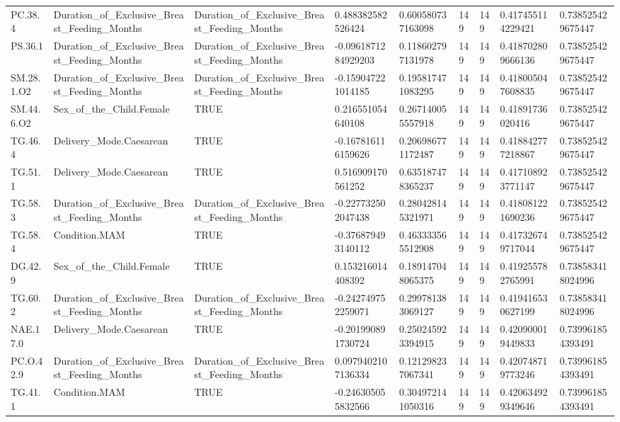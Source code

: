 \begin{longtable}{lllllllll}
PC.38.4 & Duration\_of\_Exclusive\_Breast\_Feeding\_Months & Duration\_of\_Exclusive\_Breast\_Feeding\_Months & 0.488382582526424 & 0.600580737163098 & 149 & 149 & 0.417455114229421 & 0.738525429675447 \\
PS.36.1 & Duration\_of\_Exclusive\_Breast\_Feeding\_Months & Duration\_of\_Exclusive\_Breast\_Feeding\_Months & -0.0961871284929203 & 0.118602797131978 & 149 & 149 & 0.418702809666136 & 0.738525429675447 \\
SM.28.1.O2 & Duration\_of\_Exclusive\_Breast\_Feeding\_Months & Duration\_of\_Exclusive\_Breast\_Feeding\_Months & -0.159047221014185 & 0.195817471083295 & 149 & 149 & 0.418005047608835 & 0.738525429675447 \\
SM.44.6.O2 & Sex\_of\_the\_Child.Female & TRUE & 0.216551054640108 & 0.267140055557918 & 149 & 149 & 0.41891736020416 & 0.738525429675447 \\
TG.46.4 & Delivery\_Mode.Caesarean & TRUE & -0.167816116159626 & 0.206986771172487 & 149 & 149 & 0.418842777218867 & 0.738525429675447 \\
TG.51.1 & Delivery\_Mode.Caesarean & TRUE & 0.516909170561252 & 0.635187478365237 & 149 & 149 & 0.417108923771147 & 0.738525429675447 \\
TG.58.3 & Duration\_of\_Exclusive\_Breast\_Feeding\_Months & Duration\_of\_Exclusive\_Breast\_Feeding\_Months & -0.227732502047438 & 0.280428145321971 & 149 & 149 & 0.418081221690236 & 0.738525429675447 \\
TG.58.4 & Condition.MAM & TRUE & -0.376879493140112 & 0.463333565512908 & 149 & 149 & 0.417326749717044 & 0.738525429675447 \\
DG.42.9 & Sex\_of\_the\_Child.Female & TRUE & 0.153216014408392 & 0.189147048065375 & 149 & 149 & 0.419255782765991 & 0.738583418024996 \\
TG.60.2 & Duration\_of\_Exclusive\_Breast\_Feeding\_Months & Duration\_of\_Exclusive\_Breast\_Feeding\_Months & -0.242749752259071 & 0.299781383069127 & 149 & 149 & 0.419416530627199 & 0.738583418024996 \\
NAE.17.0 & Delivery\_Mode.Caesarean & TRUE & -0.201990891730724 & 0.250245923394915 & 149 & 149 & 0.420900019449833 & 0.739961854393491 \\
PC.O.42.9 & Duration\_of\_Exclusive\_Breast\_Feeding\_Months & Duration\_of\_Exclusive\_Breast\_Feeding\_Months & 0.0979402107136334 & 0.121298237067341 & 149 & 149 & 0.420748719773246 & 0.739961854393491 \\
TG.41.1 & Condition.MAM & TRUE & -0.246305055832566 & 0.304972141050316 & 149 & 149 & 0.420634929349646 & 0.739961854393491 \\

\end{longtable}

